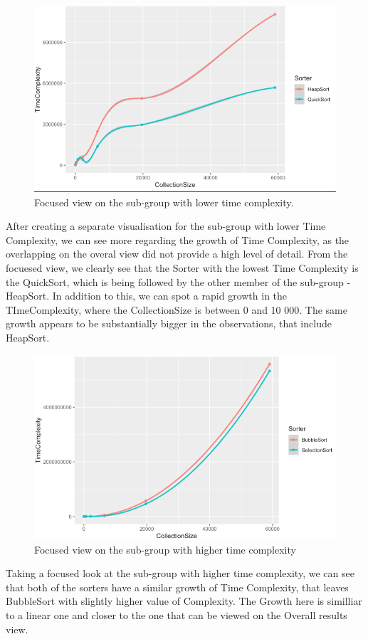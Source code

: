 \documentclass[]{report}
\begin{document}
\begin{(algorithm}
\begin{figure}
	\centering
	\includegraphics[width=0.7\linewidth]{OverviewOfConstantTimeComplexityAlgorithms}
	\caption[Figure 3.2]{Focused view on the sub-group with lower time complexity.}
	\label{fig:overviewofconstanttimecomplexityalgorithms}
\end{figure}
\newpage	
After creating a separate visualisation for the sub-group with lower Time Complexity, we can see more regarding the growth of Time Complexity, as the overlapping on the overal view did not provide a high level of detail. From the focuesed view, we clearly see that the Sorter with the lowest Time Complexity is the QuickSort, which is being followed by the other member of the sub-group - HeapSort. In addition to this, we can spot a rapid growth in the TImeComplexity, where the CollectionSize is between 0 and 10 000. The same growth appears to be substantially bigger in the observations, that include HeapSort.

\begin{figure}
	\centering
	\includegraphics[width=0.7\linewidth]{FocusedViewOnBigTimeComplexity}
	\caption[Figure 3.3]{Focused view on the sub-group with higher time complexity}
	\label{fig:focusedviewonbigtimecomplexity}
\end{figure}
\newpage
Taking a focused look at the sub-group with higher time complexity, we can see that both of the sorters have a similar growth of Time Complexity, that leaves BubbleSort with slightly higher value of Complexity. The Growth here is similliar to a linear one and closer to the one that can be viewed on the Overall results view.

\end{(algorithm}
\end{document}
